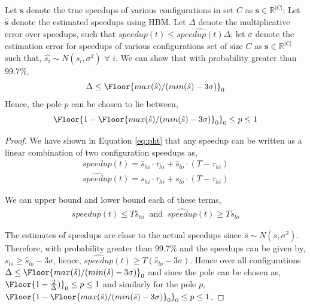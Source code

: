 \begin{theorem}
Let $\mathbf{s}$ denote the true speedups of various configurations in set $C$ as $\mathbf{s} \in \mathbb{R}^{|C|}$; Let $\hat{\mathbf{s}}$ denote the estimated speedups using HBM. Let $\Delta$ denote the multiplicative error over speedups, such that $speedup(t) \leq \hat{speedup(t)}\Delta $; let $\sigma$ denote the estimation error for speedups of various configurations set of size $C$ as $\mathbf{s} \in \mathbb{R}^{|C|}$ such that, $\hat{s_i} \sim N(s_i, \sigma^2)$ $\forall$ $i$. We can show that with probability greater than 99.7\%,
$$
\Delta \leq \Floor{max(\hat{s})/(min(\hat{s}) -  3\sigma)}_0
$$
Hence, the pole $p$ can be chosen to lie between, $$\Floor{1- \Floor{max(\hat{s})/(min(\hat{s}) -  3\sigma)}_0}_0 \leq p \leq 1$$
\end{theorem}

\begin{proof}
We have shown in Equation \ref{eq:pht} that any speedup can be written as a
linear combination of two configuration speedups as,
\begin{align}
speedup(t) = \hat{s}_{hi} \cdot \tau_{hi} + \hat{s}_{lo} \cdot (T - \tau_{hi})
\end{align}
\begin{align}
\widehat{speedup}(t) = s_{hi} \cdot \tau_{hi} + s_{lo} \cdot (T - \tau_{hi})
\end{align}

We can upper bound and lower bound each of these terms,
\begin{align}
speedup(t) \leq T \hat{s}_{hi} \;\; \text{and} \;\; \widehat{speedup}(t) \geq T s_{lo}
\end{align}

The estimates of speedups are close to the actual speedups since
$\hat{s} \sim N(s, \sigma^2)$. Therefore,  with probability greater than 99.7\%
and the speedups can be given by, $s_{lo} \geq \hat{s}_{lo} - 3 \sigma$,
hence, $\hat{speedup}(t) \geq T (\hat{s}_{lo} -3 \sigma)$. Hence over all
configurations $\Delta \leq \Floor{max(\hat{s})/(min(\hat{s}) -  3\sigma)}_0$
and since the pole can be chosen as, $\Floor{1-\frac{2}{\Delta})}_0\leq p \leq 1$
and similarly for the pole $p$,
$\Floor{1- \Floor{max(\hat{s})/(min(\hat{s}) -  3\sigma)}_0}_0 \leq p \leq 1$.

\end{proof}
